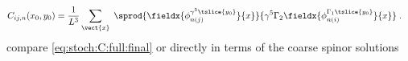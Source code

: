 \begin{align}
C_{ij,n}(x_0, y_0)
&=
\frac{1}{L^{3}} \sum_{\vect{x}} \;
\sprod{
	\fieldx{\phi_{n(j)}^{\gamma^{5} \tslice{y_0}}}{x}
}{
	\gamma^{5}
	\Gamma_2
	\fieldx{ \phi_{n(i)}^{\Gamma_1 \tslice{y_0}} }{x}
} \;.
\end{align}
compare \cref{eq:stoch:C:full:final} or directly in terms of the coarse spinor solutions
